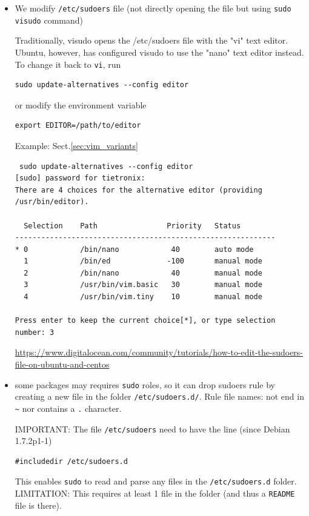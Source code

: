 \begin{itemize}
  \item We modify \verb!/etc/sudoers! file (not directly opening the file but
  using \verb!sudo visudo! command)

Traditionally, visudo opens the /etc/sudoers file with the "vi" text editor.
Ubuntu, however, has configured visudo to use the "nano" text editor instead. To
change it back to \verb!vi!, run 
\begin{verbatim}
sudo update-alternatives --config editor
\end{verbatim}
or modify the environment variable
\begin{verbatim}
export EDITOR=/path/to/editor
\end{verbatim}

Example: Sect.\ref{sec:vim_variants}
\begin{verbatim}
 sudo update-alternatives --config editor
[sudo] password for tietronix:
There are 4 choices for the alternative editor (providing /usr/bin/editor).

  Selection    Path                Priority   Status
------------------------------------------------------------
* 0            /bin/nano            40        auto mode
  1            /bin/ed             -100       manual mode
  2            /bin/nano            40        manual mode
  3            /usr/bin/vim.basic   30        manual mode
  4            /usr/bin/vim.tiny    10        manual mode

Press enter to keep the current choice[*], or type selection number: 3
\end{verbatim}
\url{https://www.digitalocean.com/community/tutorials/how-to-edit-the-sudoers-file-on-ubuntu-and-centos}


  \item some packages may requires \verb!sudo! roles, so it can drop sudoers
  rule by creating a new file in the folder \verb!/etc/sudoers.d/!. Rule file
  names: not end in \verb!~! nor contains a \verb!.! character. 
  
IMPORTANT: The file \verb!/etc/sudoers! need to have the line (since Debian
1.7.2p1-1)
\begin{verbatim}
#includedir /etc/sudoers.d
\end{verbatim}
This enables \verb!sudo! to read and parse any files in the
\verb!/etc/sudoers.d! folder. LIMITATION: This requires at least 1 file in the
folder (and thus a \verb!README! file is there).

\end{itemize}

